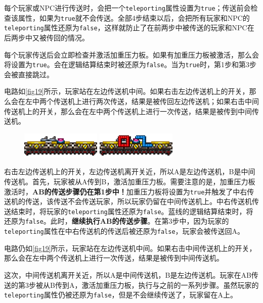 每个玩家或NPC进行传送时，会把一个\lstinline{teleporting}属性设置为\lstinline{true}；传送前会检查该属性，如果为\lstinline{true}就不会传送。全部4步结束以后，会把所有玩家和NPC的\lstinline{teleporting}属性还原为\lstinline{false}，这样就防止了在前两步中被传送的玩家和NPC在后两步中又被传回的情况。

每个玩家传送后会立即检查并激活加重压力板。如果有加重压力板被激活，那么会将设置为\lstinline{true}。会在逻辑结算结束时被还原为\lstinline{false}。当为\lstinline{true}时，第1步和第3步会被直接跳过。

\begin{example}
电路如\autoref{fig19}所示，玩家站在左边传送机中间。如果右击左边传送机上的开关，那么会在左中两个传送机上进行两次传送，结果是被传回左边传送机；如果右击中间传送机上的开关，那么会在左中两个传送机上进行一次传送，结果是被传到中间传送机。

\begin{figure}[!ht]
\centering
\includegraphics{images/379.png}
\qquad
\includegraphics{images/380.png}
\caption{}\label{fig19}
\end{figure}

右击左边传送机上的开关，左边传送机离开关近，所以A是左边传送机，B是中间传送机。首先，玩家被从A传到B，激活加重压力板。需要注意的是，加重压力板激活时，\textbf{AB的传送步骤仍在第1步中！}加重压力板将设置为\lstinline{true}并触发了中右传送机的传送，该传送不会传送玩家，所以玩家仍留在中间传送机上。中右传送机传送结束时，将玩家的\lstinline{teleporting}属性还原为\lstinline{false}。蓝线的逻辑结算结束时，将还原为\lstinline{false}。此时，\textbf{继续执行AB的传送步骤}。在第3步中，因为玩家的\lstinline{teleporting}属性在中右传送机的传送后被还原为\lstinline{false}，玩家会被传送回A。
\end{example}

\begin{example}
电路仍如\autoref{fig19}所示，玩家站在左边传送机中间。如果右击中间传送机上的开关，那么会在左中两个传送机上进行一次传送，结果是被传到中间传送机。

这次，中间传送机离开关近，所以A是中间传送机，B是左边传送机。玩家在AB传送的第3步被从B传到A，激活加重压力板，执行与之前的一系列步骤。虽然玩家的\lstinline{teleporting}属性仍被还原为\lstinline{false}，但是不会继续传送了，玩家留在A上。
\end{example}

